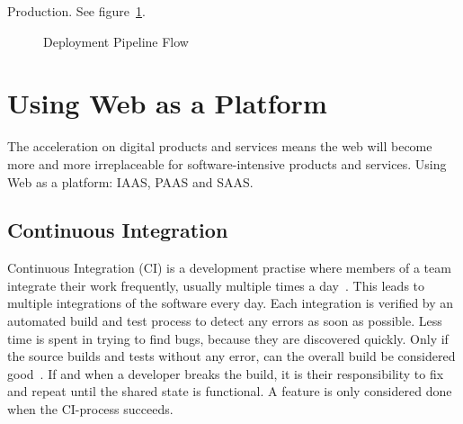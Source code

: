 \documentclass[english]{tktltiki2}
\begin{document}
Production. See figure~\ref{figure:deployment-pipeline-flow}.

\begin{figure}[h!]

    \vspace{1cm}
    \centering


    \caption{Deployment Pipeline Flow}
    \label{figure:deployment-pipeline-flow}

    \vspace{1cm}

\end{figure}


\section{Using Web as a Platform}

The acceleration on digital products and services means the web will become more and more irreplaceable for software-intensive products and services. Using Web as a platform: IAAS, PAAS and SAAS.

\subsection{Continuous Integration}

Continuous Integration (CI) is a development practise where members of a team integrate their work frequently, usually multiple times a day~\cite{Fow06}. This leads to multiple integrations of the software every day. Each integration is verified by an automated build and test process to detect any errors as soon as possible. Less time is spent in trying to find bugs, because they are discovered quickly. Only if the source builds and tests without any error, can the overall build be considered good~\cite{Fow06}. If and when a developer breaks the build, it is their responsibility to fix and repeat until the shared state is functional. A feature is only considered done when the CI-process succeeds.
\end{document}
